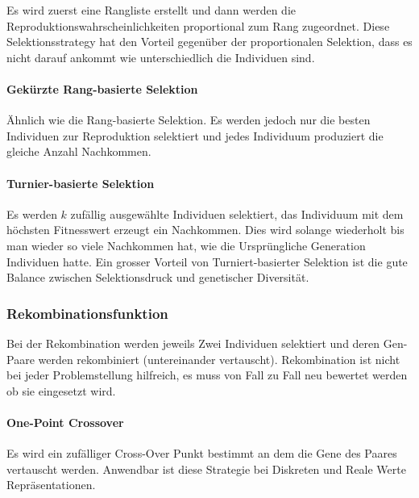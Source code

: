         Es wird zuerst eine Rangliste erstellt und dann werden die Reproduktionswahrscheinlichkeiten proportional zum Rang zugeordnet.
        Diese Selektionsstrategy hat den Vorteil gegenüber der proportionalen Selektion,
        dass es nicht darauf ankommt wie unterschiedlich die Individuen sind.

      \paragraph{Gekürzte Rang-basierte Selektion}

        Ähnlich wie die Rang-basierte Selektion.
        Es werden jedoch nur die besten Individuen zur Reproduktion selektiert und
        jedes Individuum produziert die gleiche Anzahl Nachkommen.

      \paragraph{Turnier-basierte Selektion\label{par:Turnier}}

        Es werden \(k\) zufällig ausgewählte Individuen selektiert,
        das Individuum mit dem höchsten Fitnesswert erzeugt ein Nachkommen.
        Dies wird solange wiederholt bis man wieder so viele Nachkommen hat,
        wie die Ursprüngliche Generation Individuen hatte.
        Ein grosser Vorteil von Turniert-basierter Selektion ist die gute Balance zwischen
        Selektionsdruck und genetischer Diversität.

    \subsubsection{Rekombinationsfunktion}

        Bei der Rekombination werden jeweils Zwei Individuen selektiert und
        deren Gen-Paare werden rekombiniert (untereinander vertauscht).
        Rekombination ist nicht bei jeder Problemstellung hilfreich,
        es muss von Fall zu Fall neu bewertet werden ob sie eingesetzt wird.

        \paragraph{One-Point Crossover}

          Es wird ein zufälliger Cross-Over Punkt bestimmt an dem die Gene des Paares vertauscht werden.
          Anwendbar ist diese Strategie bei Diskreten und Reale Werte Repräsentationen.

